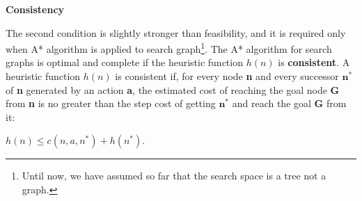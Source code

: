 \textbf{Consistency} \vspace{3.5pt}

The second condition is slightly stronger than feasibility, and it is required only when A* algorithm is applied to search graph\footnote{Until now, we have assumed so far that the search space is a tree not a graph.}.
The A* algorithm for search graphs is optimal and complete if the heuristic function $h(n)$ is \textbf{consistent}. A heuristic function $h(n)$ is consistent if, for every node
\textbf{n} and every successor $\mathbf{n^*}$ of \textbf{n} generated by an action \textbf{a}, the estimated cost of reaching the goal node \textbf{G} from \textbf{n} is no 
greater than the step cost of getting $\mathbf{n^*}$ and reach the goal \textbf{G} from it: \vspace{3.5pt}
\begin{center}
    $h(n) \le c(n, a, n^*) + h(n^*)$.
\end{center} \vspace{3.5pt}

